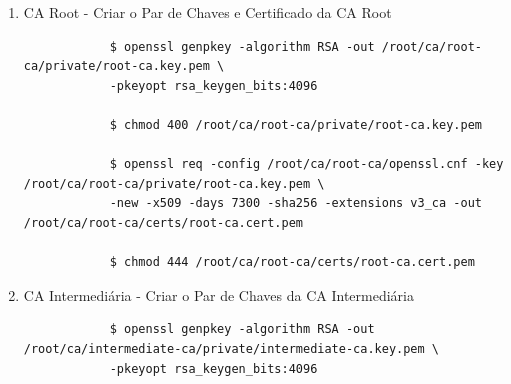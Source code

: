 \begin{enumerate}
\begin{tcolorbox}[width=\textwidth, enhanced, breakable]
{\begin{verbatim}
			[ req ]
			default_bits        = 4096
			distinguished_name  = req_distinguished_name
			string_mask         = utf8only
			default_md          = sha256
			prompt              = no
			
			[ req_distinguished_name ]
			countryName                     = BR
			stateOrProvinceName             = Sao Paulo
			localityName                    = Sao Paulo
			0.organizationName              = senhasegura
			organizationalUnitName          = SEGi9
			commonName                      = My Intermediate CA
			emailAddress                    = segi9@senhasegura.com
			
			[ v3_intermediate_ca ]
			subjectKeyIdentifier = hash
			authorityKeyIdentifier = keyid:always,issuer
			basicConstraints = critical,CA:true,pathlen:0
			keyUsage = critical, digitalSignature, cRLSign, keyCertSign
			
			[ crl_ext ]
			authorityKeyIdentifier=keyid:always
			
			[ usr_cert ]
			basicConstraints = CA:FALSE
			nsCertType = client, email
			nsComment = "User Certificate"
			subjectKeyIdentifier = hash
			authorityKeyIdentifier = keyid,issuer
			keyUsage = critical, nonRepudiation, digitalSignature, keyEncipherment
			extendedKeyUsage = clientAuth, emailProtection
		\end{verbatim}
	}
	\end{tcolorbox}

	\item CA Root - Criar o Par de Chaves e Certificado da CA Root
	\begin{tcolorbox}[width=\textwidth]
	{\footnotesize
		\begin{verbatim}
			$ openssl genpkey -algorithm RSA -out /root/ca/root-ca/private/root-ca.key.pem \
			-pkeyopt rsa_keygen_bits:4096

			$ chmod 400 /root/ca/root-ca/private/root-ca.key.pem
			
			$ openssl req -config /root/ca/root-ca/openssl.cnf -key /root/ca/root-ca/private/root-ca.key.pem \
			-new -x509 -days 7300 -sha256 -extensions v3_ca -out /root/ca/root-ca/certs/root-ca.cert.pem

			$ chmod 444 /root/ca/root-ca/certs/root-ca.cert.pem
		\end{verbatim}
	}
	\end{tcolorbox}

	\item CA Intermediária - Criar o Par de Chaves da CA Intermediária
	\begin{tcolorbox}[width=\textwidth]
	{\footnotesize
		\begin{verbatim}
			$ openssl genpkey -algorithm RSA -out /root/ca/intermediate-ca/private/intermediate-ca.key.pem \
			-pkeyopt rsa_keygen_bits:4096


\end{verbatim}}
\end{tcolorbox}
\end{enumerate}
